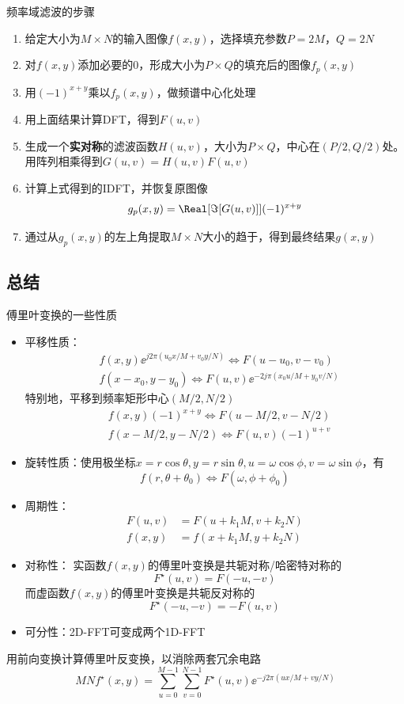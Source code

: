 频率域滤波的步骤
\begin{enumerate}
	\item 给定大小为$M\times N$的输入图像$f(x,y)$，选择填充参数$P=2M$，$Q=2N$
	\item 对$f(x,y)$添加必要的0，形成大小为$P\times Q$的填充后的图像$f_p(x,y)$
	\item 用$(-1)^{x+y}$乘以$f_p(x,y)$，做频谱中心化处理
	\item 用上面结果计算DFT，得到$F(u,v)$
	\item 生成一个\textbf{实对称}的滤波函数$H(u,v)$，大小为$P\times Q$，中心在$(P/2,Q/2)$处。
	用阵列相乘得到$G(u,v)=H(u,v)F(u,v)$
	\item 计算上式得到的IDFT，并恢复原图像
	\[g_p(x,y)=\Real[\Im[G(u,v)]](-1)^{x+y}\]
	\item 通过从$g_p(x,y)$的左上角提取$M\times N$大小的趋于，得到最终结果$g(x,y)$
\end{enumerate}

\subsection{总结}
傅里叶变换的一些性质
\begin{itemize}
	\item 平移性质：
	\[\begin{aligned}
	&f(x,y)\ee^{j2\pi(u_0x/M+v_0y/N)}\iff F(u-u_0,v-v_0)\\
	&f(x-x_0,y-y_0)\iff F(u,v)\ee^{-2j\pi(x_0u/M+y_0v/N)}
	\end{aligned}\]
	特别地，平移到频率矩形中心$(M/2,N/2)$
	\[\begin{aligned}
	&f(x,y)(-1)^{x+y}\iff F(u-M/2,v-N/2)\\
	&f(x-M/2,y-N/2)\iff F(u,v)(-1)^{u+v}
	\end{aligned}\]
	\item 旋转性质：使用极坐标$x=r\cos\theta,y=r\sin\theta,u=\omega\cos\phi,v=\omega\sin\phi$，有
	\[f(r,\theta+\theta_0)\iff F(\omega,\phi+\phi_0)\]
	\item 周期性：
	\[\begin{aligned}
	F(u,v)&=F(u+k_1M,v+k_2N)\\
	f(x,y)&=f(x+k_1M,y+k_2N)
	\end{aligned}\]
	\item 对称性：
	实函数$f(x,y)$的傅里叶变换是共轭对称/哈密特对称的
	\[F^\star(u,v)=F(-u,-v)\]
	而虚函数$f(x,y)$的傅里叶变换是共轭反对称的
	\[F^\star(-u,-v)=-F(u,v)\]
	\item 可分性：2D-FFT可变成两个1D-FFT
\end{itemize}

用前向变换计算傅里叶反变换，以消除两套冗余电路
\[MNf^\star(x,y)=\sum_{u=0}^{M-1}\sum_{v=0}^{N-1} F^\star(u,v)\ee^{-j2\pi (ux/M+vy/N)}\]